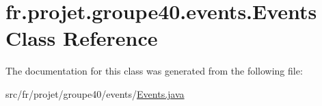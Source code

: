 \hypertarget{classfr_1_1projet_1_1groupe40_1_1events_1_1_events}{}\section{fr.\+projet.\+groupe40.\+events.\+Events Class Reference}
\label{classfr_1_1projet_1_1groupe40_1_1events_1_1_events}


The documentation for this class was generated from the following file\+:\begin{DoxyCompactItemize}
\item 
src/fr/projet/groupe40/events/\hyperlink{_events_8java}{Events.\+java}\end{DoxyCompactItemize}
